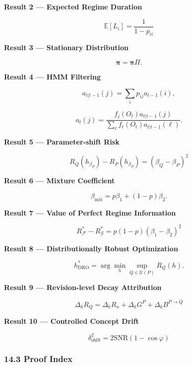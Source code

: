 \textbf{Result 2 --- Expected Regime Duration}

\[\boxed{
\mathbb E[L_i]=\frac1{1-p_{ii}}
}\]

\textbf{Result 3 --- Stationary Distribution}

\[\boldsymbol\pi=\boldsymbol\pi\Pi.\]

\textbf{Result 4 --- HMM Filtering}

\[a_{t|t-1}(j)=\sum_i p_{ij}a_{t-1}(i),\]

\[a_t(j)
=
\frac{f_j(O_t)a_{t|t-1}(j)}
{\sum_\ell f_\ell(O_t)a_{t|t-1}(\ell)}.\]

\textbf{Result 5 --- Parameter-shift Risk}

\[\boxed{
R_Q(h_{\beta_P})-R_P(h_{\beta_P})
=
(\beta_Q-\beta_P)^2
}\]

\textbf{Result 6 --- Mixture Coefficient}

\[\beta_{\mathrm{mix}}
=
p\beta_1+(1-p)\beta_2.\]

\textbf{Result 7 --- Value of Perfect Regime Information}

\[\boxed{
R_{\mathcal F}^*-R_{\mathcal G}^*
=
p(1-p)(\beta_1-\beta_2)^2
}\]

\textbf{Result 8 --- Distributionally Robust Optimization}

\[h_{\mathrm{DRO}}^*
=
\arg\min_h
\sup_{Q\in\mathcal U(P)}R_Q(h).\]

\textbf{Result 9 --- Revision-level Decay Attribution}

\[\boxed{
\Delta_kR_Q
=
\Delta_k\widehat R_n
+
\Delta_kG^P
+
\Delta_kB^{P\rightarrow Q}
}\]

\textbf{Result 10 --- Controlled Concept Drift}

\[\boxed{
\delta_{\mathrm{shift}}^2
=
2\mathrm{SNR}(1-\cos\varphi)
}\]

\hypertarget{part-4-77-0001-proof-index}{%
\subsubsection{14.3 Proof Index}\label{part-4-77-0001-proof-index}}

